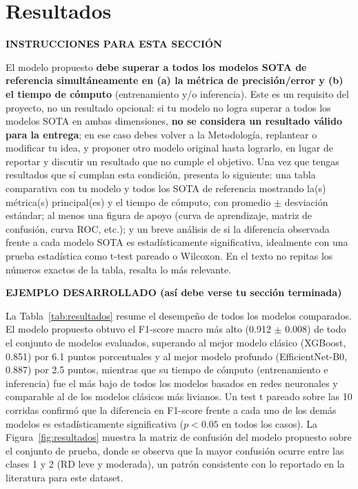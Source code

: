 \documentclass[pdflatex,sn-mathphys-num]{sn-jnl}
\newenvironment{instruccion}{%
  \par\noindent\textbf{\color{blue!55!black}INSTRUCCIONES PARA ESTA SECCIÓN}%
  \par\vspace{2pt}\noindent\itshape\small
}{%
  \par\normalfont\vspace{6pt}
}
\newenvironment{ejemplo}{%
  \par\noindent\textbf{\color{green!35!black}EJEMPLO DESARROLLADO (así debe verse tu sección terminada)}%
  \par\vspace{2pt}\noindent\small
}{%
  \par\normalfont\vspace{6pt}
}
\begin{document}
\section{Resultados}\label{sec:resultados}

\begin{instruccion}
El modelo propuesto \textbf{debe superar a todos los modelos SOTA de referencia simultáneamente en (a) la métrica de precisión/error y (b) el tiempo de cómputo} (entrenamiento y/o inferencia). Este es un requisito del proyecto, no un resultado opcional: si tu modelo no logra superar a todos los modelos SOTA en ambas dimensiones, \textbf{no se considera un resultado válido para la entrega}; en ese caso debes volver a la Metodología, replantear o modificar tu idea, y proponer otro modelo original hasta lograrlo, en lugar de reportar y discutir un resultado que no cumple el objetivo. Una vez que tengas resultados que sí cumplan esta condición, presenta lo siguiente: una tabla comparativa con tu modelo y todos los SOTA de referencia mostrando la(s) métrica(s) principal(es) y el tiempo de cómputo, con promedio $\pm$ desviación estándar; al menos una figura de apoyo (curva de aprendizaje, matriz de confusión, curva ROC, etc.); y un breve análisis de si la diferencia observada frente a cada modelo SOTA es estadísticamente significativa, idealmente con una prueba estadística como t-test pareado o Wilcoxon. En el texto no repitas los números exactos de la tabla, resalta lo más relevante.
\end{instruccion}

\begin{ejemplo}
La Tabla~\ref{tab:resultados} resume el desempeño de todos los modelos comparados. El modelo propuesto obtuvo el F1-score macro más alto (0.912 $\pm$ 0.008) de todo el conjunto de modelos evaluados, superando al mejor modelo clásico (XGBoost, 0.851) por 6.1 puntos porcentuales y al mejor modelo profundo (EfficientNet-B0, 0.887) por 2.5 puntos, mientras que su tiempo de cómputo (entrenamiento e inferencia) fue el más bajo de todos los modelos basados en redes neuronales y comparable al de los modelos clásicos más livianos. Un test t pareado sobre las 10 corridas confirmó que la diferencia en F1-score frente a cada uno de los demás modelos es estadísticamente significativa ($p < 0.05$ en todos los casos). La Figura~\ref{fig:resultados} muestra la matriz de confusión del modelo propuesto sobre el conjunto de prueba, donde se observa que la mayor confusión ocurre entre las clases 1 y 2 (RD leve y moderada), un patrón consistente con lo reportado en la literatura para este dataset.
\end{ejemplo}
\end{document}
